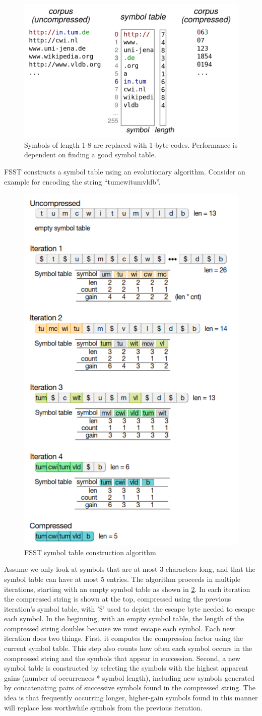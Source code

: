 \documentclass[11pt]{article}
\begin{document}
\begin{figure}[H]
    \centering
    \includegraphics[width=0.5\linewidth]{fig/fsst-example.pdf}
    \caption{Symbols of length 1-8 are replaced with 1-byte codes. Performance is dependent on finding a good symbol table.}\label{fig:fsst-example}
\end{figure}

FSST constructs a symbol table using an evolutionary algorithm. Consider an example for encoding the string ``tumcwitumvldb''.
\begin{figure}[H]
    \centering
    \includegraphics[width=0.4\linewidth]{fig/fsst-algo.pdf}
    \caption{FSST symbol table construction algorithm}\label{fig:fsst-algo}
\end{figure}
Assume we only look at symbols that are at most 3 characters long, and that the symbol table can have at most 5 entries. The algorithm proceeds in multiple iterations, starting with an empty symbol table as shown in \cref{fig:fsst-algo}. In each iteration the compressed string is shown at the top, compressed using the previous iteration's symbol table, with '\$' used to depict the escape byte needed to escape each symbol. In the beginning, with an empty symbol table, the length of the compressed string doubles because we must escape each symbol. Each new iteration does two things. First, it computes the compression factor using the current symbol table. This step also counts how often each symbol occurs in the compressed string and the symbols that appear in succession. Second, a new symbol table is constructed by selecting the symbols with the highest apparent gains (number of occurrences * symbol length), including new symbols generated by concatenating pairs of successive symbols found in the compressed string. The idea is that frequently occurring longer, higher-gain symbols found in this manner will replace less worthwhile symbols from the previous iteration.
\end{document}
